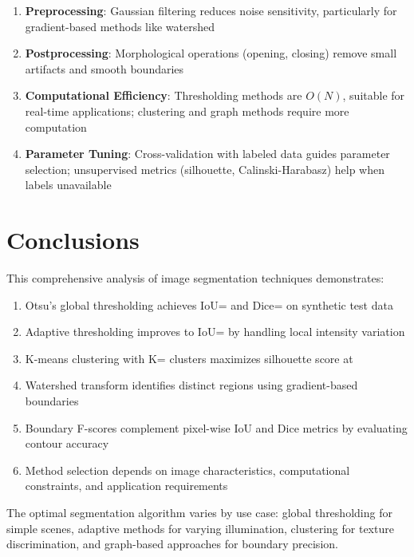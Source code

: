 \documentclass[a4paper, 11pt]{article}
\begin{document}
\begin{enumerate}
\item \textbf{Preprocessing}: Gaussian filtering reduces noise sensitivity, particularly
for gradient-based methods like watershed
\item \textbf{Postprocessing}: Morphological operations (opening, closing) remove small
artifacts and smooth boundaries
\item \textbf{Computational Efficiency}: Thresholding methods are $O(N)$, suitable for
real-time applications; clustering and graph methods require more computation
\item \textbf{Parameter Tuning}: Cross-validation with labeled data guides parameter
selection; unsupervised metrics (silhouette, Calinski-Harabasz) help when labels unavailable
\end{enumerate}

\section{Conclusions}

This comprehensive analysis of image segmentation techniques demonstrates:

\begin{enumerate}
\item Otsu's global thresholding achieves IoU= and
Dice= on synthetic test data
\item Adaptive thresholding improves to IoU= by handling
local intensity variation
\item K-means clustering with K= clusters maximizes silhouette
score at 
\item Watershed transform identifies  distinct
regions using gradient-based boundaries
\item Boundary F-scores complement pixel-wise IoU and Dice metrics by evaluating contour
accuracy
\item Method selection depends on image characteristics, computational constraints, and
application requirements
\end{enumerate}

The optimal segmentation algorithm varies by use case: global thresholding for simple
scenes, adaptive methods for varying illumination, clustering for texture discrimination,
and graph-based approaches for boundary precision.
\end{document}

